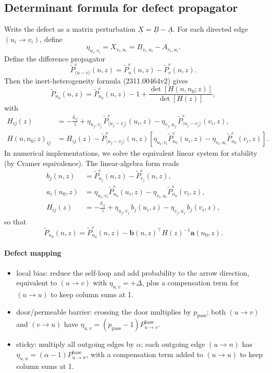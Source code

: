 \documentclass[11pt]{article}
\begin{document}
\subsection{Determinant formula for defect propagator}
Write the defect as a matrix perturbation $\underline{X}=\underline{B}-\underline{A}$. For each directed edge $(u_i\to v_i)$, define
\begin{equation}
  \eta_{u_i,v_i}=X_{v_i,u_i}=B_{v_i,u_i}-A_{v_i,u_i}.
\end{equation}
Define the difference propagator
\begin{equation}
  \tilde P^e_{\langle u-v\rangle}(n,z)=\tilde P^e_{u}(n,z)-\tilde P^e_{v}(n,z).
\end{equation}
Then the inert-heterogeneity formula (2311.00464v2) gives
\begin{equation}
  \tilde P_{n_0}(n,z)=\tilde P^e_{n_0}(n,z)-1+\frac{\det[H(n,n_0;z)]}{\det[H(z)]},
\end{equation}
with
\begin{align}
  H_{ij}(z)&=-\frac{\delta_{ij}}{z}+\eta_{u_j,v_j}\,\tilde P^e_{\langle u_j-v_j\rangle}(u_i,z)-\eta_{v_j,u_j}\,\tilde P^e_{\langle u_j-v_j\rangle}(v_i,z),\\
  H(n,n_0;z)_{ij}&=H_{ij}(z)-\tilde P^e_{\langle u_j-v_j\rangle}(n,z)\left[\eta_{u_i,v_i}\tilde P^e_{n_0}(u_i,z)-\eta_{v_i,u_i}\tilde P^e_{n_0}(v_i,z)\right].
\end{align}
In numerical implementations, we solve the equivalent linear system for stability (by Cramer equivalence).
The linear-algebra form reads
\begin{align}
  b_j(n,z)&=\tilde P^e_{u_j}(n,z)-\tilde P^e_{v_j}(n,z),\\
  a_i(n_0,z)&=\eta_{u_i,v_i}\tilde P^e_{n_0}(u_i,z)-\eta_{v_i,u_i}\tilde P^e_{n_0}(v_i,z),\\
  H_{ij}(z)&=-\frac{\delta_{ij}}{z}+\eta_{u_j,v_j}\,b_j(u_i,z)-\eta_{v_j,u_j}\,b_j(v_i,z),
\end{align}
so that
\begin{equation}
  \tilde P_{n_0}(n,z)=\tilde P^e_{n_0}(n,z)-\mathbf{b}(n,z)^\top H(z)^{-1}\mathbf{a}(n_0,z).
\end{equation}

\paragraph{Defect mapping}
\begin{itemize}
  \item local bias: reduce the self-loop and add probability to the arrow direction, equivalent to $(u\to v)$ with $\eta_{u,v}=+\Delta$, plus a compensation term for $(u\to u)$ to keep column sums at 1.
  \item door/permeable barrier: crossing the door multiplies by $p_{\text{pass}}$; both $(u\to v)$ and $(v\to u)$ have $\eta_{u,v}=(p_{\text{pass}}-1)P_{u\to v}^{\text{base}}$.
  \item sticky: multiply all outgoing edges by $\alpha$; each outgoing edge $(u\to n)$ has $\eta_{u,n}=(\alpha-1)P_{u\to n}^{\text{base}}$, with a compensation term added to $(u\to u)$ to keep column sums at 1.
\end{itemize}
\end{document}
